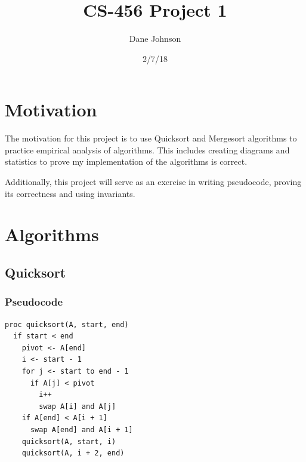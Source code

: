 \documentclass[a4paper,12pt]{article}
\title{CS-456 Project 1}
\author{Dane Johnson}
\date{2/7/18}
\begin{document}
\maketitle
\newpage
\section{Motivation}

The motivation for this project is to use Quicksort and Mergesort algorithms to practice empirical analysis of algorithms.
This includes creating diagrams and statistics to prove my implementation of the algorithms is correct.

Additionally, this project will serve as an exercise in writing pseudocode, proving its correctness and using invariants.
\section{Algorithms}
\subsection{Quicksort}
\subsubsection{Pseudocode}
\begin{verbatim}
proc quicksort(A, start, end)
  if start < end
    pivot <- A[end]
    i <- start - 1 
    for j <- start to end - 1
      if A[j] < pivot
        i++
        swap A[i] and A[j]
    if A[end] < A[i + 1]
      swap A[end] and A[i + 1]
    quicksort(A, start, i)
    quicksort(A, i + 2, end)
\end{verbatim}
\end{document}
